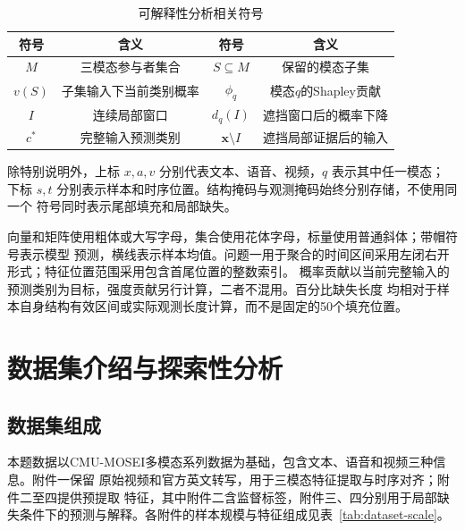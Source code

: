 \documentclass[bwprint]{gmcmthesis}
\begin{document}
\begin{table}[htbp]
 \centering
 \caption{可解释性分析相关符号}
 \label{tab:symbols-p3}
 \begin{tabular*}{\linewidth}{@{\extracolsep{\fill}}cccc@{}}
 \toprule
 符号 & 含义 & 符号 & 含义 \\
 \midrule
 $M$ & 三模态参与者集合 & $S\subseteq M$ & 保留的模态子集 \\
 $v(S)$ & 子集输入下当前类别概率 & $\phi_q$ & 模态$q$的Shapley贡献 \\
 $I$ & 连续局部窗口 & $d_q(I)$ & 遮挡窗口后的概率下降 \\
 $c^*$ & 完整输入预测类别 & $\boldsymbol x\setminus I$ & 遮挡局部证据后的输入 \\
 \bottomrule
 \end{tabular*}
\end{table}

除特别说明外，上标 $x,a,v$ 分别代表文本、语音、视频，$q$ 表示其中任一模态；
下标 $s,t$ 分别表示样本和时序位置。结构掩码与观测掩码始终分别存储，不使用同一个
符号同时表示尾部填充和局部缺失。

向量和矩阵使用粗体或大写字母，集合使用花体字母，标量使用普通斜体；带帽符号表示模型
预测，横线表示样本均值。问题一用于聚合的时间区间采用左闭右开形式；特征位置范围采用包含首尾位置的整数索引。
概率贡献以当前完整输入的预测类别为目标，强度贡献另行计算，二者不混用。百分比缺失长度
均相对于样本自身结构有效区间或实际观测长度计算，而不是固定的50个填充位置。

\section{数据集介绍与探索性分析}
\label{sec:dataset}

\subsection{数据集组成}

本题数据以CMU-MOSEI多模态系列数据为基础\citep{mosei2018}，包含文本、语音和视频三种信息。附件一保留
原始视频和官方英文转写，用于三模态特征提取与时序对齐；附件二至四提供预提取
特征，其中附件二含监督标签，附件三、四分别用于局部缺失条件下的预测与解释。各附件的样本规模与特征组成见表~\ref{tab:dataset-scale}。
\end{document}
